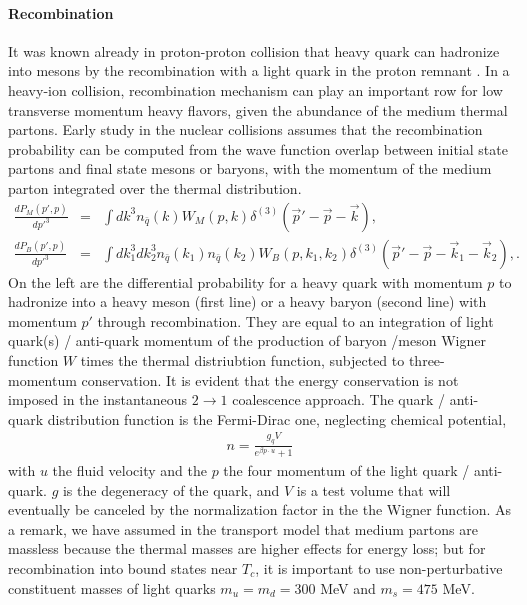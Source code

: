 \paragraph{Recombination}
It was known already in proton-proton collision that heavy quark can hadronize into mesons by the recombination with a light quark in the proton remnant \cite{Mehen:2003rf}.
In a heavy-ion collision, recombination mechanism can play an important row for low transverse momentum heavy flavors, given the abundance of the medium thermal partons.
Early study in the nuclear collisions \cite{Oh:2009zj} assumes that the recombination probability can be computed from the wave function overlap between initial state partons and final state mesons or baryons, with the momentum of the medium parton integrated over the thermal distribution.
\begin{eqnarray}
\frac{dP_M(p', p)}{dp'^3} &=& \int dk^3 n_{\bar{q}}(k) W_{M}(p, k)\delta^{(3)}(\vec{p}'-\vec{p}-\vec{k}), \label{eq:meson_recombine}\\
\frac{dP_B(p', p)}{dp'^3} &=& \int dk_1^3 dk_2^3 n_{\bar{q}}(k_1)  n_{\bar{q}}(k_2) W_{B}(p, k_1, k_2)\delta^{(3)}(\vec{p}'-\vec{p}-\vec{k}_1 - \vec{k}_2), \label{eq:baryon_recombine}.
\end{eqnarray}
On the left are the differential probability for a heavy quark with momentum $p$ to hadronize into a heavy meson (first line) or a heavy baryon (second line) with momentum $p'$ through recombination.
They are equal to an integration of light quark(s) / anti-quark momentum  of the production of baryon /meson Wigner function $W$ times the thermal distriubtion function, subjected to three-momentum conservation.
It is evident that the energy conservation is not imposed in the instantaneous $2\rightarrow 1$ coalescence approach.
The quark / anti-quark distribution function is the Fermi-Dirac one, neglecting chemical potential, 
\begin{eqnarray}
n = \frac{g_q V}{e^{\beta p\cdot u} + 1}
\end{eqnarray}
with $u$ the fluid velocity and the $p$ the four momentum of the light quark / anti-quark.
$g$ is the degeneracy of the quark, and $V$ is a test volume that will eventually be canceled by the normalization factor in the the Wigner function.
As a remark, we have assumed in the transport model that medium partons are massless because the thermal masses are higher effects for energy loss; but for recombination into bound states near $T_c$, it is important to use non-perturbative constituent masses of light quarks $m_u = m_d = 300$ MeV and $m_s = 475$ MeV.

